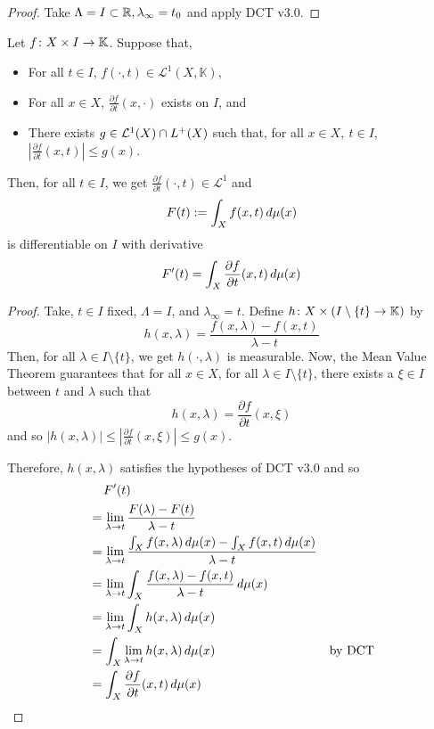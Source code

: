 \documentclass[11pt,leqno,oneside]{amsbook}
\numberwithin{thm}{section}
\newcommand{\cL}{\mathcal{L}}
\newcommand{\K}{\mathbb{K}} %
\begin{document}
\begin{proof}
  Take \(\Lambda = I \subset {\mathbb R}, \lambda_\infty = t_0\) and apply DCT
  v3.0.
\end{proof}
\begin{cor}
  Let \(f \from X \times I \to \K\). Suppose that,
  \begin{itemize}
  \item For all \(t \in  I\), \(f(\cdot, t) \in \cL^1(X,\K)\),
  \item For all \(x \in X\), \(\frac{\partial f}{\partial
      t}(x,\cdot)\) exists on \(I\), and
  \item There exists \(g \in \cL^1(X) \intersect L^+(X)\) such that,
    for all \(x \in X,\ t \in I\), \(\left| \frac{\partial f}{\partial
      t}(x,t)\right| \leq g(x)\).
  \end{itemize}
  Then, for all \(t \in I\), we get \(\frac{\partial f}{\partial
    t}(\cdot, t) \in \cL^1\)  and \[
    F(t) := \int_X f(x,t) \, d\mu(x)
  \]
  is differentiable on \(I\) with derivative \[
    F'(t) = \int_X \frac{\partial f}{\partial t}(x,t) \, d\mu(x)
  \]
\end{cor}
\begin{proof}
  Take, \(t \in I\) fixed, \(\Lambda = I\), and \(\lambda_\infty =
  t\). Define \(h \from X \times (I \setminus \{t\} \to \K)\) by
  \[h(x,\lambda) = \frac{f(x,\lambda) - f(x,t)}{\lambda - t}\]
  Then, for all \(\lambda \in I \setminus \{t\}\), we get \(h(\cdot,
  \lambda)\) is measurable. Now, the Mean Value Theorem guarantees
  that for all \(x \in X\), for all \(\lambda \in I \setminus \{t\}\),
  there exists a \(\xi \in I\) between $t$ and $\lambda$ such that \[
    h(x,\lambda) = \frac{\partial f}{\partial t}(x, \xi)
  \]
  and so \(|h(x,\lambda)| \leq \left| \frac{\partial f}{\partial
      t}(x,\xi) \right| \leq g(x)\).

  Therefore, \(h(x,\lambda)\) satisfies the hypotheses of DCT v3.0 and
  so
  \begin{align*}
    &\quad\, F'(t) \\
    &= \lim_{\lambda \to t} \frac{F(\lambda) - F(t)}{\lambda - t} \\
    &= \lim_{\lambda \to t} \frac{\int_X f(x,\lambda) \, d\mu(x) - \int_X f(x,t) \, d\mu(x)}{\lambda - t} \\
    &= \lim_{\lambda \to t} \int_X \frac{ f(x,\lambda) - f(x,t)}{\lambda - t} \, d\mu(x) \\
    &= \lim_{\lambda \to t} \int_X h(x,\lambda) \, d \mu(x) \\
    &= \int_X \lim_{\lambda \to t} h(x,\lambda) \, d\mu(x) &\text{by DCT}\\
    &= \int_X \frac{\partial f}{\partial t}(x,t) \, d\mu(x)
  \end{align*}
\end{proof}
\end{document}
